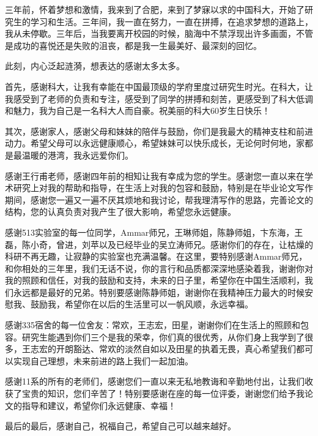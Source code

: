 \begin{acknowledgements}
三年前，怀着梦想和激情，我来到了合肥，来到了梦寐以求的中国科大，开始了研究生的学习和生活。三年间，我一直在努力，一直在拼搏，在追求梦想的道路上，我从未停歇。三年后，当我要离开校园的时候，脑海中不禁浮现出许多画面，不管是成功的喜悦还是失败的沮丧，都是我一生最美好、最深刻的回忆。

此刻，内心泛起涟漪，想表达的感谢太多太多。

首先，感谢科大，让我有幸能在中国最顶级的学府里度过研究生时光。在科大，让我感受到了老师的负责和专注，感受到了同学的拼搏和刻苦，更感受到了科大低调和魅力，我为自己是一名科大人而自豪。祝美丽的科大60岁生日快乐！

其次，感谢家人，感谢父母和妹妹的陪伴与鼓励，你们是我最大的精神支柱和前进动力。希望父母可以永远健康顺心，希望妹妹可以快乐成长，无论何时何地，家都是最温暖的港湾，我永远爱你们。

感谢王行甫老师，感谢四年前的相知让我有幸成为您的学生。感谢您一直以来在学术研究上对我的帮助和指导，在生活上对我的包容和鼓励，特别是在毕业论文写作期间，感谢您一遍又一遍不厌其烦地和我讨论，帮我理清写作的思路，完善论文的结构，您的认真负责对我产生了很大影响，希望您永远健康。

感谢513实验室的每一位同学，Ammar师兄，王琳师姐，陈静师姐，卞东海，王磊，陈小奇，曾进，刘苹以及已经毕业的吴立涛师兄。感谢你们的存在，让枯燥的科研不再无趣，让寂静的实验室也充满温馨。在这里，要特别感谢Ammar师兄，和你相处的三年里，我们无话不说，你的言行和品质都深深地感染着我，谢谢你对我的照顾和信任，对我的鼓励和支持，未来的日子里，希望你在中国生活顺利，我们永远都是最好的兄弟。特别要感谢陈静师姐，谢谢你在我精神压力最大的时候安慰我、鼓励我，希望你在以后的生活里可以一帆风顺，永远幸福。

感谢335宿舍的每一位舍友：常欢，王志宏，田星，谢谢你们在生活上的照顾和包容。研究生能遇到你们三个是我的荣幸，你们真的很优秀，从你们身上我学到了很多，王志宏的开朗豁达、常欢的淡然自如以及田星的执着无畏，真心希望我们都可以实现自己理想，未来前进的路上我们一起加油。

感谢11系的所有的老师们，感谢您们一直以来无私地教诲和辛勤地付出，让我们收获了宝贵的知识，您们辛苦了！特别要感谢在座的每一位评委，谢谢您们给予我论文的指导和建议，希望你们永远健康、幸福！

最后的最后，感谢自己，祝福自己，希望自己可以越来越好。



\cleardoublepage
\end{acknowledgements}
